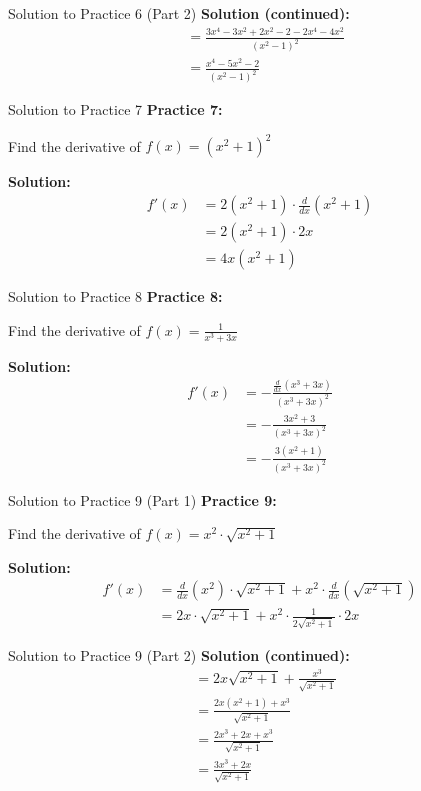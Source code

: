 \documentclass[aspectratio=169]{beamer}
\begin{document}
\begin{frame}{Solution to Practice 6 (Part 2)}
\textbf{Solution (continued):}
\[
\begin{aligned}
  &= \frac{3x^4 - 3x^2 + 2x^2 - 2 - 2x^4 - 4x^2}{(x^2 - 1)^2} \\
  &= \frac{x^4 - 5x^2 - 2}{(x^2 - 1)^2}
\end{aligned}
\]
\end{frame}

\begin{frame}{Solution to Practice 7}
\textbf{Practice 7:}

Find the derivative of $f(x) = (x^2 + 1)^2$

\textbf{Solution:}
\[
\begin{aligned}
  f'(x) &= 2(x^2 + 1) \cdot \frac{d}{dx}(x^2 + 1) \\
  &= 2(x^2 + 1) \cdot 2x \\
  &= 4x(x^2 + 1)
\end{aligned}
\]
\end{frame}

\begin{frame}{Solution to Practice 8}
\textbf{Practice 8:}

Find the derivative of $f(x) = \frac{1}{x^3 + 3x}$

\textbf{Solution:}
\[
\begin{aligned}
  f'(x) &= -\frac{\frac{d}{dx}(x^3 + 3x)}{(x^3 + 3x)^2} \\
  &= -\frac{3x^2 + 3}{(x^3 + 3x)^2} \\
  &= -\frac{3(x^2 + 1)}{(x^3 + 3x)^2}
\end{aligned}
\]
\end{frame}

\begin{frame}{Solution to Practice 9 (Part 1)}
\textbf{Practice 9:}

Find the derivative of $f(x) = x^2 \cdot \sqrt{x^2 + 1}$

\textbf{Solution:}
\[
\begin{aligned}
  f'(x) &= \frac{d}{dx}(x^2) \cdot \sqrt{x^2 + 1} + x^2 \cdot \frac{d}{dx}(\sqrt{x^2 + 1}) \\
  &= 2x \cdot \sqrt{x^2 + 1} + x^2 \cdot \frac{1}{2\sqrt{x^2 + 1}} \cdot 2x
\end{aligned}
\]
\end{frame}

\begin{frame}{Solution to Practice 9 (Part 2)}
\textbf{Solution (continued):}
\[
\begin{aligned}
  &= 2x\sqrt{x^2 + 1} + \frac{x^3}{\sqrt{x^2 + 1}} \\
  &= \frac{2x(x^2 + 1) + x^3}{\sqrt{x^2 + 1}} \\
  &= \frac{2x^3 + 2x + x^3}{\sqrt{x^2 + 1}} \\
  &= \frac{3x^3 + 2x}{\sqrt{x^2 + 1}}
\end{aligned}
\]
\end{frame}
\end{document}
